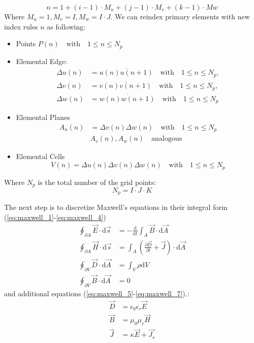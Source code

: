 \begin{equation}
n=1+(i-1)\cdot M_{u}+(j-1)\cdot M_{v}+(k-1)\cdot M{w}
\label{eq:discrete_index}
\end{equation}
Where $M_{u}=1,M_{v}=I,M_{w}=I\cdot J$. We can reindex primary elements with new index rules $n$ as following:
\begin{itemize}
\item Points $P(n) \quad \mathrm{with} \quad 1\leq n \leq N_{p}$
\item Elemental Edge:
    \begin{align*}
		\Delta u(n)&=\overline{u(n)u(n+1)}  \quad \mathrm{with} \quad 1\leq n \leq N_{p}, \nonumber\\
		\Delta v(n)&=\overline{v(n)v(n+1)}  \quad \mathrm{with} \quad 1\leq n \leq N_{p}, \nonumber\\
		\Delta w(n)&=\overline{w(n)w(n+1)}  \quad \mathrm{with} \quad 1\leq n \leq N_{p}
		\end{align*}
\item Elemental Planes
		\begin{align*}
		A_{u}(n)&=\Delta v(n)\Delta w(n) \quad \mathrm{with} \quad 1\leq n\leq N_{p}\nonumber\\
		&A_{v}(n),A_{w}(n)  \quad \mathrm{analogous}
		\end{align*}
\item Elemental Cells
		\begin{equation*}
		V(n)=\Delta u(n)\Delta v(n)\Delta w(n)  \quad \mathrm{with} \quad 1\leq n\leq N_{p}
		\end{equation*}
\end{itemize}
Where $N_{p}$ is the total number of the grid points:
\begin{equation*}
N_{p}=I\cdot J\cdot K
\end{equation*}

The next step is to discretize Maxwell's equations in their integral form (\ref{eq:maxwell_1}-\ref{eq:maxwell_4}) 
\begin{align}
\oint_{\partial A}\vec{E}\cdot\mathrm{d}\vec{s}&=
-\frac{\mathrm{d}}{\mathrm{d}t}\int_{A}\vec{B}\cdot\mathrm{d}\vec{A}
\label{eq:maxwell_1}\\
\oint_{\partial A}\vec{H}\cdot\mathrm{d}\vec{s}&=
\int_{A}(\frac{\partial\vec{D}}{\partial t}+\vec{J})\cdot\mathrm{d}\vec{A}
\label{eq:maxwell_2}\\
\oint_{\partial V}\vec{D}\cdot\mathrm{d}\vec{A}&=
\int_{V}\rho\mathrm{d}V
\label{eq:maxwell_3}\\
\oint_{\partial V}\vec{B}\cdot\mathrm{d}\vec{A}&=0
\label{eq:maxwell_4}
\end{align}
and additional equations (\ref{eq:maxwell_5}-\ref{eq:maxwell_7}).:
\begin{align}
\vec{D}&=\epsilon_{0}\epsilon_{r}\vec{E}
\label{eq:maxwell_5}\\
\vec{B}&=\mu_{0}\mu_{r}\vec{H}
\label{eq:maxwell_6}\\
\vec{J}&=\kappa\vec{E}+\vec{J_{s}}
\label{eq:maxwell_7}
\end{align}
